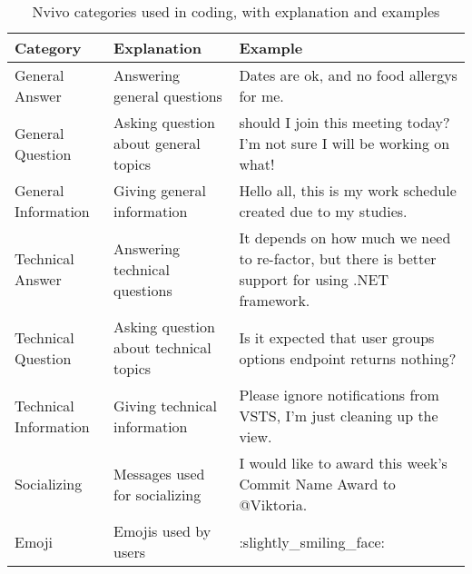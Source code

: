 \begin{table}
\centering
\caption{Nvivo categories used in coding, with explanation and examples}
\label{tab:nvivo}
\begin{tabular}{|l|p{3.5cm}|p{5cm}|}
\hline
\textbf{Category} & \textbf{Explanation} & \textbf{Example}\\ \hline
\hline
General Answer & Answering general questions & Dates are ok, and no food allergys for me.\\ \hline
General Question & Asking question about general topics &  should I join this meeting today? I'm not sure I will be working on what!\\ \hline
General Information & Giving general information & Hello all, this is my work schedule created due to my studies.\\ \hline
Technical Answer & Answering technical questions & It depends on how much we need to re-factor, but there is better support for using .NET framework.\\ \hline
Technical Question & Asking question about technical topics & Is it expected that user groups options endpoint returns nothing?\\ \hline
Technical Information & Giving technical information & Please ignore notifications from VSTS, I'm just cleaning up the view.\\ \hline
Socializing & Messages used for socializing & I would like to award this week’s Commit Name Award to @Viktoria.\\ \hline
Emoji & Emojis used by users & :slightly\_smiling\_face: \\
\hline
\end{tabular}
\end{table}





